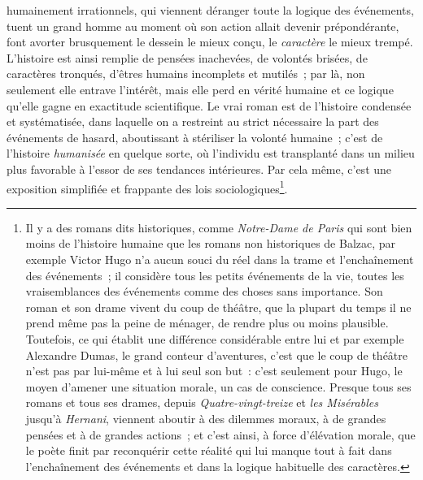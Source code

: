 \documentclass[french,twoside]{book} %
\begin{document}
humainement irrationnels, qui viennent déranger toute la logique des événements, tuent un grand homme au moment où son action allait devenir prépondérante, font avorter brusquement le dessein le mieux conçu, le \emph{caractère} le mieux trempé. L’histoire est ainsi remplie de pensées inachevées, de volontés brisées, de caractères tronqués, d’êtres humains incomplets et mutilés ; par là, non seulement elle entrave l’intérêt, mais elle perd en vérité humaine et ce logique qu’elle gagne en exactitude scientifique. Le vrai roman est de l’histoire condensée et systématisée, dans laquelle on a restreint au strict nécessaire la part des événements de hasard, aboutissant à stériliser la volonté humaine ; c’est de l’histoire \emph{humanisée} en quelque sorte, où l’individu est transplanté dans un milieu plus favorable à l’essor de ses tendances intérieures. Par cela même, c’est une exposition simplifiée et frappante des lois sociologiques\footnote{ Il y a des romans dits historiques, comme \emph{Notre-Dame de Paris} qui sont bien moins de l’histoire humaine que les romans non historiques de Balzac, par exemple Victor Hugo n’a aucun souci du réel dans la trame et l’enchaînement des événements ; il considère tous les petits événements de la vie, toutes les vraisemblances des événements comme des choses sans importance. Son roman et son drame vivent du coup de théâtre, que la plupart du temps il ne prend même pas la peine de ménager, de rendre plus ou moins plausible. Toutefois, ce qui établit une différence considérable entre lui et par exemple Alexandre Dumas, le grand conteur d’aventures, c’est que le coup de théâtre n’est pas par lui-même et à lui seul son but : c’est seulement pour Hugo, le moyen d’amener une situation morale, un cas de conscience. Presque tous ses romans et tous ses drames, depuis \emph{Quatre-vingt-treize} et \emph{les Misérables} jusqu’à \emph{Hernani}, viennent aboutir à des dilemmes moraux, à de grandes pensées et à de grandes actions ; et c’est ainsi, à force d’élévation morale, que le poète finit par reconquérir cette réalité qui lui manque tout à fait dans l’enchaînement des événements et dans la logique habituelle des caractères.}.
\end{document}
